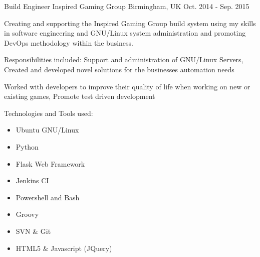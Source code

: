 \begin{cventries}
  \cventry
    {Build Engineer} %
    {Inspired Gaming Group} %
    {Birmingham, UK} %
    {Oct. 2014 - Sep. 2015} %
    {
        \begin{cvitems} %
            \item {Creating and supporting the Inspired Gaming Group build system using my skills in software engineering and GNU/Linux system administration and promoting DevOps methodology within the business.}
            \item {Responsibilities included: Support and administration of GNU/Linux Servers, Created and developed novel solutions for the businesses automation needs}
            \item{Worked with developers to improve their quality of life when working on new or existing games, Promote test driven development}
            \item{Technologies and Tools used:}
            \begin{itemize}
                \item{Ubuntu GNU/Linux}
                \item{Python}
                \item{Flask Web Framework}
                \item{Jenkins CI}
                \item{Powershell and Bash}
                \item{Groovy}
                \item{SVN \& Git}
                \item{HTML5 \& Javascript (JQuery)}
            \end{itemize}
        \end{cvitems}
    }


\end{cventries}
